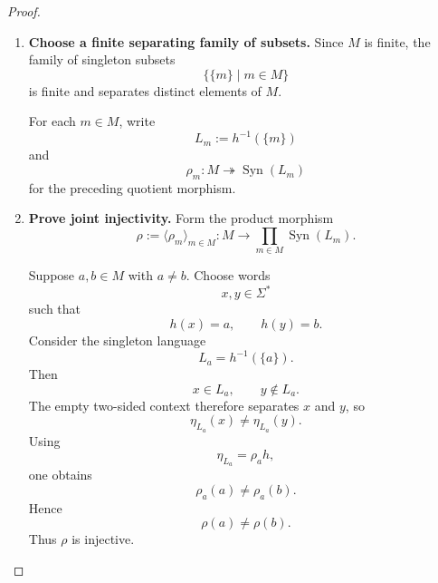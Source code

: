 \begin{proof}
\begin{enumerate}
        Since \(\eta_{L_S}\) coequalizes \(\ker(h)\), there is a unique monoid
        morphism
        \[
            \rho_S:
            M
            \to
            \operatorname{Syn}(L_S)
        \]
        satisfying
        \[
            \rho_Sh=\eta_{L_S}.
        \]
        The factorization is
        \[
        \begin{tikzcd}[column sep=large]
            \Sigma^*
                \arrow[r, two heads, "h"]
                \arrow[dr, two heads, "\eta_{L_S}"']
            &
            M
                \arrow[d, dashed, "\rho_S"]
            \\
            &
            \operatorname{Syn}(L_S).
        \end{tikzcd}
        \]

        Because both \(h\) and \(\eta_{L_S}\) are surjective,
        \(\rho_S\) is surjective. Indeed, if
        \(z\in\operatorname{Syn}(L_S)\), choose \(x\in\Sigma^*\) with
        \(\eta_{L_S}(x)=z\). Then
        \[
            z
            =
            \eta_{L_S}(x)
            =
            \rho_S(h(x)).
        \]

        \item \textbf{Choose a finite separating family of subsets.}
        Since \(M\) is finite, the family of singleton subsets
        \[
            \bigl\{\{m\}\mid m\in M\bigr\}
        \]
        is finite and separates distinct elements of \(M\).

        For each \(m\in M\), write
        \[
            L_m:=h^{-1}(\{m\})
        \]
        and
        \[
            \rho_m:
            M\twoheadrightarrow
            \operatorname{Syn}(L_m)
        \]
        for the preceding quotient morphism.

        \item \textbf{Prove joint injectivity.}
        Form the product morphism
        \[
            \rho
            :=
            \langle\rho_m\rangle_{m\in M}:
            M
            \to
            \prod_{m\in M}
            \operatorname{Syn}(L_m).
        \]

        Suppose \(a,b\in M\) with \(a\neq b\). Choose words
        \[
            x,y\in\Sigma^*
        \]
        such that
        \[
            h(x)=a,
            \qquad
            h(y)=b.
        \]
        Consider the singleton language
        \[
            L_a=h^{-1}(\{a\}).
        \]
        Then
        \[
            x\in L_a,
            \qquad
            y\notin L_a.
        \]
        The empty two-sided context therefore separates \(x\) and \(y\), so
        \[
            \eta_{L_a}(x)
            \neq
            \eta_{L_a}(y).
        \]
        Using
        \[
            \eta_{L_a}
            =
            \rho_a h,
        \]
        one obtains
        \[
            \rho_a(a)
            \neq
            \rho_a(b).
        \]
        Hence
        \[
            \rho(a)\neq\rho(b).
        \]
        Thus \(\rho\) is injective.


\end{enumerate}
\end{proof}
